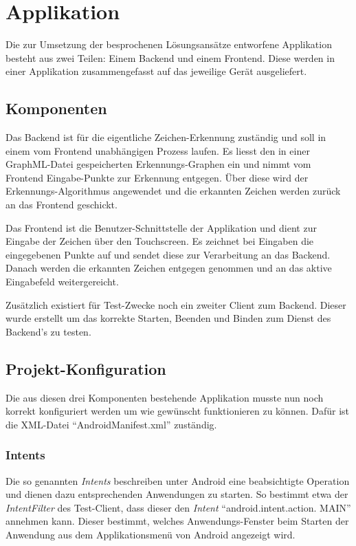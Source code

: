 \chapter{Applikation}

Die zur Umsetzung der besprochenen Lösungsansätze entworfene Applikation besteht aus zwei Teilen: Einem Backend und einem Frontend. Diese werden in einer Applikation zusammengefasst auf das jeweilige Gerät ausgeliefert.

\section{Komponenten}

Das Backend ist für die eigentliche Zeichen-Erkennung zuständig und soll in einem vom Frontend unabhängigen Prozess laufen. Es liesst den in einer GraphML-Datei gespeicherten Erkennungs-Graphen ein und nimmt vom Frontend Eingabe-Punkte zur Erkennung entgegen. Über diese wird der Erkennungs-Algorithmus angewendet und die erkannten Zeichen werden zurück an das Frontend geschickt.

Das Frontend ist die Benutzer-Schnittstelle der Applikation und dient zur Eingabe der Zeichen über den Touchscreen. Es zeichnet bei Eingaben die eingegebenen Punkte auf und sendet diese zur Verarbeitung an das Backend. Danach werden die erkannten Zeichen entgegen genommen und an das aktive Eingabefeld weitergereicht.

Zusätzlich existiert für Test-Zwecke noch ein zweiter Client zum Backend. Dieser wurde erstellt um das korrekte Starten, Beenden und Binden zum Dienst des Backend's zu testen.

\section{Projekt-Konfiguration}

Die aus diesen drei Komponenten bestehende Applikation musste nun noch korrekt konfiguriert werden um wie gewünscht funktionieren zu können. Dafür ist die XML-Datei ``AndroidManifest.xml'' zuständig.

\subsection{Intents}

Die so genannten \emph{Intents} beschreiben unter Android eine beabsichtigte Operation und dienen dazu entsprechenden Anwendungen zu starten. So bestimmt etwa der \emph{IntentFilter} des Test-Client, dass dieser den \emph{Intent} ``android.intent.action. MAIN'' annehmen kann. Dieser bestimmt, welches Anwendungs-Fenster beim Starten der Anwendung aus dem Applikationsmenü von Android angezeigt wird.

